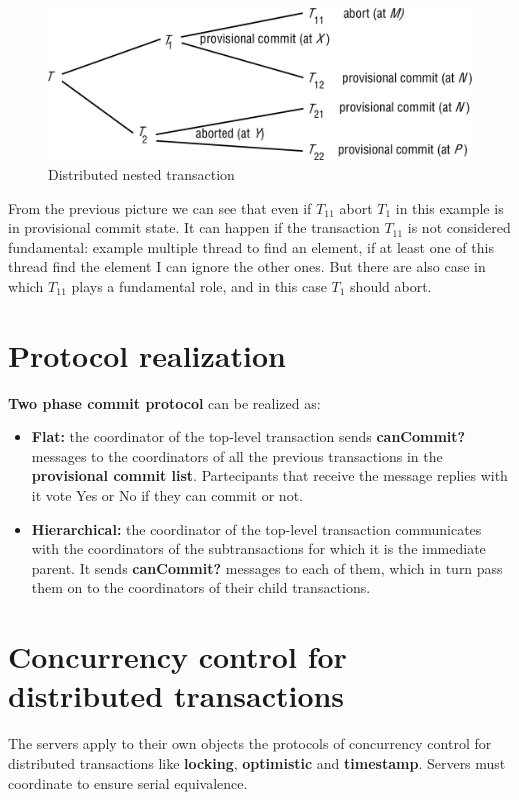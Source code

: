 \begin{figure}[!h]
    \centering
    \includegraphics[width=.60\linewidth]{images/DistributedTransactions/DistnestedTransactions.png}
    \caption{Distributed nested transaction}
\end{figure}

From the previous picture we can see that even if \(T_{11}\) abort \(T_1\) in this example is in provisional commit state. It can happen if the transaction \(T_{11}\) is not considered fundamental: example multiple thread to find an element, if at least one of this thread find the element I can ignore the other ones. But there are also case in which \(T_{11}\) plays a fundamental role, and in this case \(T_1\) should abort.


\section{Protocol realization}
\textbf{Two phase commit protocol} can be realized as:
\begin{itemize}
    \item \textbf{Flat:} the coordinator of the top-level transaction sends  \textbf{canCommit?} messages to the coordinators of all the previous transactions in the \textbf{provisional commit list}. Partecipants that receive the message replies with it vote Yes or No if they can commit or not.
    \item \textbf{Hierarchical:} the coordinator of the top-level transaction communicates with the coordinators of the subtransactions for which it is the immediate parent. It sends \textbf{canCommit?} messages to each of them, which in turn pass them on to the coordinators of their child transactions.
\end{itemize}


\section{Concurrency control for distributed transactions}
The servers apply to their own objects the protocols of concurrency control for distributed transactions like \textbf{locking}, \textbf{optimistic} and \textbf{timestamp}. Servers must coordinate to ensure serial equivalence.

